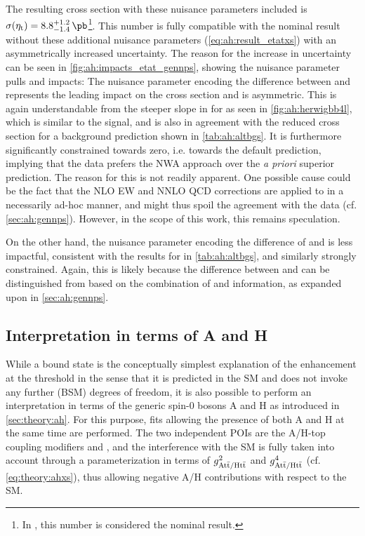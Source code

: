 The resulting \etat cross section with these nuisance parameters included is $\sigetat = 8.8^{+1.2}_{-1.4} \, \si{\pb}$\footnote{In , this number is considered the nominal result.}. This number is fully compatible with the nominal result without these additional nuisance parameters (\cref{eq:ah:result_etatxs}) with an asymmetrically increased uncertainty. The reason for the increase in uncertainty can be seen in \cref{fig:ah:impacts_etat_gennps}, showing the nuisance parameter pulls and impacts: The nuisance parameter encoding the difference between \bbfourl and \tttWsum represents the leading impact on the \etat cross section and is asymmetric. This is again understandable from the steeper slope in \chel for \bbfourl as seen in \cref{fig:ah:herwigbb4l}, which is similar to the \etat signal, and is also in agreement with the reduced \etat cross section for a \bbfourl background prediction shown in \cref{tab:ah:altbgs}. It is furthermore significantly constrained towards zero, i.e. towards the default \tttWsum prediction, implying that the data prefers the NWA approach over the \textit{a priori} superior \bbfourl prediction. The reason for this is not readily apparent. One possible cause could be the fact that the NLO EW and NNLO QCD corrections are applied to \bbfourl in a necessarily ad-hoc manner, and might thus spoil the agreement with the data (cf. \cref{sec:ah:gennps}). However, in the scope of this work, this remains speculation.

On the other hand, the nuisance parameter encoding the difference of \pythia and \herwig is less impactful, consistent with the results for \herwig in \cref{tab:ah:altbgs}, and similarly strongly constrained. Again, this is likely because the difference between \pythia and \herwig can be distinguished from \etat based on the combination of \mtt and \chel information, as expanded upon in \cref{sec:ah:gennps}.

\subsection{Interpretation in terms of A and H}
\label{sec:ah:bestfitah}

While a \ttbar bound state is the conceptually simplest explanation of the enhancement at the \ttbar threshold in the sense that it is predicted in the SM and does not invoke any further (BSM) degrees of freedom, it is also possible to perform an interpretation in terms of the generic spin-0 bosons A and H as introduced in \cref{sec:theory:ah}. 
For this purpose, fits allowing the presence of both A and H at the same time are performed. The two independent POIs are the A/H-top coupling modifiers \gAtt and \gHtt, and the interference with the SM is fully taken into account through a parameterization in terms of $g_{\mathrm{A t \bar{t} / H t \bar{t}}}^2$ and $g_{\mathrm{A t \bar{t} / H t \bar{t}}}^4$ (cf. \cref{eq:theory:ahxs}), thus allowing negative A/H contributions with respect to the SM.

